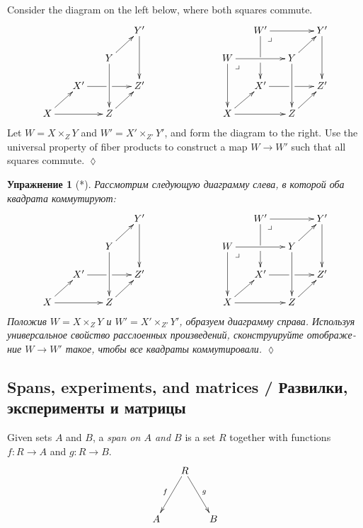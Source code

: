 \documentclass[a4paper]{book}
\makeatletter
\def\to{\rightarrow}
\def\taking{\colon}
\def\ullimit{\ar@{}[rd]|(.3)*+{\lrcorner}}
\theoremstyle{myth}
\newtheorem{excENG}[envENG]{\begin{english}Exercise\end{english}}
\newtheorem{definitionENG}[envENG]{\begin{english}Definition\end{english}}
\newenvironment{exerciseENG}{\begin{excENG}}{\hspace*{\fill}$\lozenge$\end{excENG}}
\newtheorem{excRUS}[envRUS]{Упражнение}
\newenvironment{exerciseRUS}{\begin{excRUS}}{\hspace*{\fill}$\lozenge$\end{excRUS}}
\makeatother
\begin{document}
\begin{russian}
\begin{exerciseENG}\label{exc:pointwise map of fp}
Consider the diagram on the left below, where both squares commute. 
$$
\xymatrix@=15pt{
&&&Y'\ar[dd]\\
&&Y\ar[ru]\ar[dd]\\
&X'\ar'[r][rr]&&Z'\\
X\ar[rr]\ar[ru]&&Z\ar[ru]
}
\hspace{1in}
\xymatrix@=15pt{
&W'\ar[rr]\ar'[d][dd]\ullimit&&Y'\ar[dd]\\
W\ar[rr]\ar[dd]\ullimit&&Y\ar[ru]\ar[dd]\\
&X'\ar'[r][rr]&&Z'\\
X\ar[rr]\ar[ru]&&Z\ar[ru]
}
$$
Let $W=X\times_ZY$ and $W'=X'\times_{Z'}Y'$, and form the diagram to the right. Use the universal property of fiber products to construct a map $W\to W'$ such that all squares commute.
\end{exerciseENG}

\begin{exerciseRUS}[*]\label{exc:pointwise map of fp}
Рассмотрим следующую диаграмму слева, в которой оба квадрата коммутируют: 
$$
\xymatrix@=15pt{
&&&Y'\ar[dd]\\
&&Y\ar[ru]\ar[dd]\\
&X'\ar'[r][rr]&&Z'\\
X\ar[rr]\ar[ru]&&Z\ar[ru]
}
\hspace{1in}
\xymatrix@=15pt{
&W'\ar[rr]\ar'[d][dd]\ullimit&&Y'\ar[dd]\\
W\ar[rr]\ar[dd]\ullimit&&Y\ar[ru]\ar[dd]\\
&X'\ar'[r][rr]&&Z'\\
X\ar[rr]\ar[ru]&&Z\ar[ru]
}
$$
Положив $W=X\times_ZY$ и $W'=X'\times_{Z'}Y'$, образуем диаграмму справа. Используя универсальное свойство расслоенных произведений, сконструируйте отображение $W\to W'$ такое, чтобы все квадраты коммутировали.
\end{exerciseRUS}


\subsection{Spans, experiments, and matrices / Развилки, эксперименты и матрицы}

\begin{definitionENG}\label{def:span}
Given sets $A$ and $B$, a {\em span on $A$ and $B$} is a set $R$ together with functions $f\taking R\to A$ and $g\taking R\to B$. 
$$\xymatrix@=15pt{&R\ar[ddl]_f\ar[ddr]^g\\\\A&&B}$$
\end{definitionENG}


\end{russian}
\end{document}
